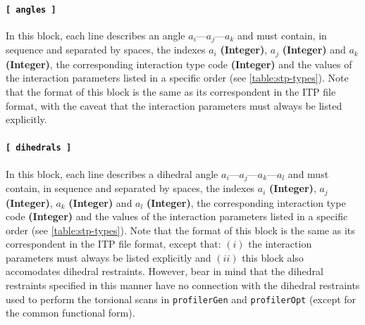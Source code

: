 \documentclass[10pt,a4paper]{report}
\numberwithin{equation}{section}
\newcommand{\profileropt}[0]{\texttt{profilerOpt}}
\newcommand{\profilergen}[0]{\texttt{profilerGen}}
\begin{document}
\paragraph{\texttt{[~angles~]}}

In this block, each line describes an angle $a_i$---$a_j$---$a_k$ and
must contain, in sequence and separated by spaces, the indexes $a_i$
\textbf{(Integer)}, $a_j$ \textbf{(Integer)} and $a_k$
\textbf{(Integer)}, the corresponding interaction type code
\textbf{(Integer)} and the values of the interaction parameters listed
in a specific order (see \autoref{table:stp-types}). Note that the
format of this block is the same as its correspondent in the ITP file
format, with the caveat that the interaction parameters must always be
listed explicitly.

\paragraph{\texttt{[~dihedrals~]}}

In this block, each line describes a dihedral angle
$a_i$---$a_j$---$a_k$---$a_l$ and must contain, in sequence and
separated by spaces, the indexes $a_i$ \textbf{(Integer)}, $a_j$
\textbf{(Integer)}, $a_k$ \textbf{(Integer)} and $a_l$
\textbf{(Integer)}, the corresponding interaction type code
\textbf{(Integer)} and the values of the interaction parameters listed
in a specific order (see \autoref{table:stp-types}). Note that the
format of this block is the same as its correspondent in the ITP file
format, except that: $(i)$ the interaction parameters must always be
listed explicitly and $(ii)$ this block also accomodates dihedral
restraints.
However, bear in mind that the dihedral restraints specified in this
manner have no connection with the dihedral restraints used to perform
the torsional scans in \profilergen{} and \profileropt{} (except for
the common functional form).
\end{document}
